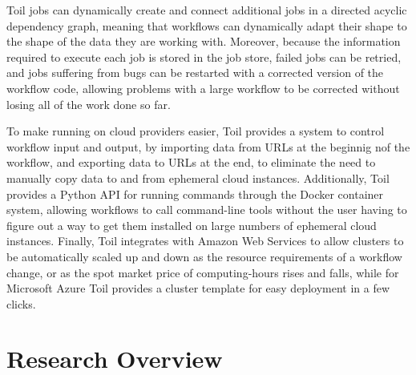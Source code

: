 Toil jobs can dynamically create and connect additional jobs in a directed acyclic dependency graph, meaning that workflows can dynamically adapt their shape to the shape of the data they are working with. Moreover, because the information required to execute each job is stored in the job store, failed jobs can be retried, and jobs suffering from bugs can be restarted with a corrected version of the workflow code, allowing problems with a large workflow to be corrected without losing all of the work done so far.

To make running on cloud providers easier, Toil provides a system to control workflow input and output, by importing data from URLs at the beginnig nof the workflow, and exporting data to URLs at the end, to eliminate the need to manually copy data to and from ephemeral cloud instances. Additionally, Toil provides a Python API for running commands through the Docker container system, allowing workflows to call command-line tools without the user having to figure out a way to get them installed on large numbers of ephemeral cloud instances. Finally, Toil integrates with Amazon Web Services to allow clusters to be automatically scaled up and down as the resource requirements of a workflow change, or as the spot market price of computing-hours rises and falls, while for Microsoft Azure Toil provides a cluster template for easy deployment in a few clicks.

\section{Research Overview}


